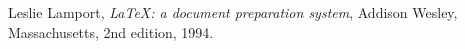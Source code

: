 \begin{thebibliography}{1}	
	
	Leslie Lamport,
	\textit{\LaTeX: a document preparation system},
	Addison Wesley, Massachusetts, 
	2nd edition,
	1994.	
	
\end{thebibliography}
